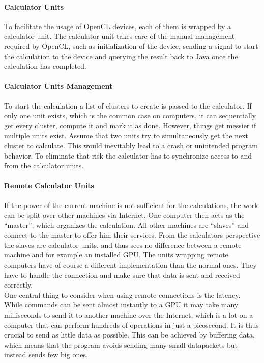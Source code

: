 \documentclass[12pt,a4paper,titlepage]{article}
\begin{document}
	\paragraph{Calculator Units}
	To facilitate the usage of OpenCL devices, each of them is wrapped by a calculator unit. The calculator unit takes care of the manual management required by OpenCL, such as initialization of the device, sending a signal to start the calculation to the device and querying the result back to Java once the calculation has completed.
	\paragraph{Calculator Units Management}
	To start the calculation a list of clusters to create is passed to the calculator. If only one unit exists, which is the common case on computers, it can sequentially get every cluster, compute it and mark it as done. However, things get messier if multiple units exist. Assume that two units try to simultaneously get the next cluster to calculate. This would inevitably lead to a crash or unintended program behavior. To eliminate that risk the calculator has to synchronize access to and from the calculator units.
	\paragraph{Remote Calculator Units}
	If the power of the current machine is not sufficient for the calculations, the work can be split over other machines via Internet. One computer then acts as the ``master'', which organizes the calculation. All other machines are ``slaves'' and connect to the master to offer him their services. From the calculators perspective the slaves are calculator units, and thus sees no difference between a remote machine and for example an installed GPU. The units wrapping remote computers have of course a different implementation than the normal ones. They have to handle the connection and make sure that data is sent and received correctly.\\
	One central thing to consider when using remote connections is the latency. While commands can be sent almost instantly to a GPU it may take many milliseconds to send it to another machine over the Internet, which is a lot on a computer that can perform hundreds of operations in just a picosecond. It is thus crucial to send as little data as possible. This can be achieved by buffering data, which means that the program avoids sending many small datapackets but instead sends few big ones.
\end{document}
